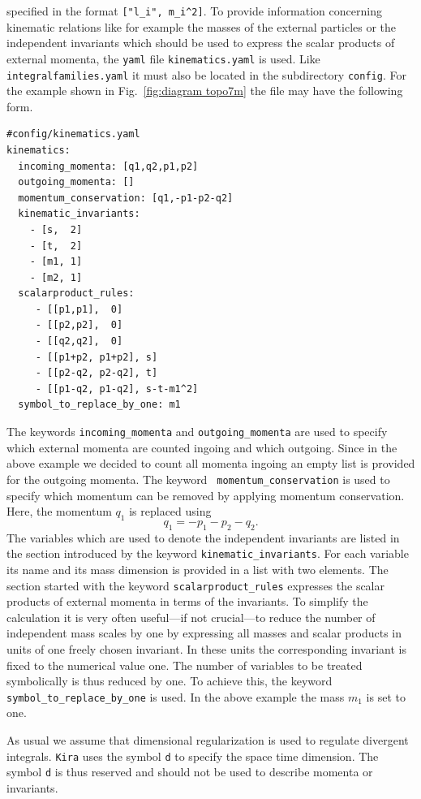 \documentclass[a4paper,12pt]{scrartcl}
\newcommand*{\kira}{\texttt{Kira}}
\newcommand*{\yaml}{\texttt{yaml}}
\def\Fig#1{{Fig.~\ref{#1}}}
\begin{document}
specified in the format \texttt{["l\_i", m\_i\^{}2]}.  To provide
information concerning kinematic relations like for example the
masses of the external particles or the independent invariants which
should be used to express the scalar products of external momenta, the
\yaml{} file \texttt{kinematics.yaml} is used. Like
\texttt{integralfamilies.yaml} it must also be located in the
subdirectory \texttt{config}. For the example shown in
\Fig{fig:diagram topo7m} the file may have the following form.
\begin{verbatim}
#config/kinematics.yaml
kinematics:
  incoming_momenta: [q1,q2,p1,p2]
  outgoing_momenta: []
  momentum_conservation: [q1,-p1-p2-q2]
  kinematic_invariants:
    - [s,  2]
    - [t,  2]
    - [m1, 1]
    - [m2, 1]
  scalarproduct_rules:
     - [[p1,p1],  0]
     - [[p2,p2],  0]
     - [[q2,q2],  0]
     - [[p1+p2, p1+p2], s]
     - [[p2-q2, p2-q2], t]
     - [[p1-q2, p1-q2], s-t-m1^2]
  symbol_to_replace_by_one: m1
\end{verbatim}
The keywords \texttt{incoming\_momenta} and \texttt{outgoing\_momenta} are used to
specify which external momenta are counted ingoing and which outgoing.
Since in the above example we decided  to count all momenta ingoing an
empty list is provided for the outgoing momenta. The keyword \texttt{
  momentum\_conservation} is used to specify which momentum can be
removed by applying momentum conservation. Here, the momentum $q_1$ is
replaced using
\begin{equation}
  q_1 = -p_1 - p_2 -q_2.
\end{equation}
The variables which are
used to denote the independent invariants are listed in the section
introduced by the keyword \texttt{kinematic\_invariants}. For each
variable its name and its mass dimension is provided in a list with
two elements.
The section started with the keyword \texttt{scalarproduct\_rules}
expresses the scalar products of external momenta in terms of the
invariants. To simplify the calculation it is very often useful---if
not crucial---to reduce the number of independent mass scales by one
by expressing all masses and scalar products in units of one freely
chosen invariant.
In these units the corresponding invariant is fixed to the
numerical value one. The number of variables to be treated
symbolically is thus reduced by one. To achieve this, the keyword
\texttt{symbol\_to\_replace\_by\_one} is used.  In the above example
the mass $m_1$ is set to one.

As usual we assume that dimensional
regularization is used to regulate divergent integrals.
\kira{} uses the symbol \texttt{d} to specify the space
time dimension. The symbol \texttt{d} is thus reserved and should not
be used to describe momenta or invariants.
\end{document}
